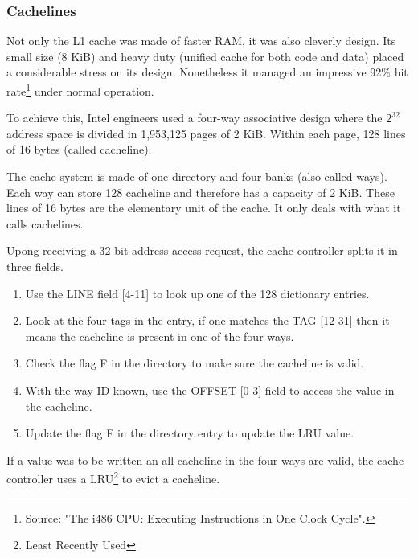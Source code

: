 \subsubsection{Cachelines}
Not only the L1 cache was made of faster RAM, it was also cleverly design. Its small size (8 KiB) and heavy duty (unified cache for both code and data) placed a considerable stress on its design. Nonetheless it managed an impressive 92\% hit rate\footnote{Source: "The i486 CPU: Executing Instructions in One Clock Cycle".} under normal operation.\\
\par
To achieve this, Intel engineers used a four-way associative design where the $2^{32}$ address space is divided in 1,953,125 pages of 2 KiB. Within each page, 128 lines of 16 bytes (called cacheline).\\
\par
{}
\par
The cache system is made of one directory and four banks (also called ways). Each way can store 128 cacheline and therefore has a capacity of 2 KiB. These lines of 16 bytes are the elementary unit of the cache. It only deals with what it calls cachelines.\\
\par
Upong receiving a 32-bit address access request, the cache controller splits it in three fields.
\begin{enumerate}
\item Use the LINE field [4-11] to look up one of the 128 dictionary entries.
\item Look at the four tags in the entry, if one matches the TAG [12-31] then it means the cacheline is present in one of the four ways.
\item Check the flag F in the directory to make sure the cacheline is valid.
\item With the way ID known, use the OFFSET [0-3] field to access the value in the cacheline.
\item Update the flag F in the directory entry to update the LRU value.
\end{enumerate}
\par
If a value was to be written an all cacheline in the four ways are valid, the cache controller uses a LRU\footnote{Least Recently Used} to evict a cacheline.\\
\par
{}
